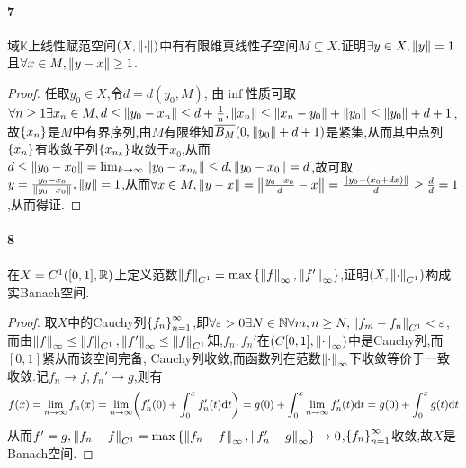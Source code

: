 \documentclass{article}
\begin{document}
\paragraph{7}域$\mathbb{K}$上线性赋范空间$(X,\left\|\cdot\right\|)$中有有限维真线性子空间$M\subsetneq X$.证明$\exists y\in X, \left\|y\right\|=1$且$\forall x\in M, \left\|y-x\right\|\geq 1$.
\begin{proof}
    任取$y_0\in X$,令$d=d(y_0,M)$, 由$\inf$性质可取$\forall n\geq 1\exists x_n\in M,d\leq \left\|y_0-x_n\right\|\leq d+\frac{1}{n}, \left\|x_n\right\|\leq \left\|x_n-y_0\right\|+\left\|y_0\right\|\leq \left\|y_0\right\|+d+1$,故$\left\{x_n\right\}$是$M$中有界序列,由$M$有限维知$\overline{B_M}(0,\left\|y_0\right\|+d+1)$是紧集,从而其中点列$\left\{x_n\right\}$有收敛子列$\left\{x_{n_k}\right\}$收敛于$x_0$,从而$d\leq \left\|y_0-x_0\right\|=\lim_{k\to\infty}\left\|y_0-x_{n_k}\right\|\leq d,\left\|y_0-x_0\right\|=d$,故可取$y=\frac{y_0-x_0}{\left\|y_0-x_0\right\|},\left\|y\right\|=1$,从而$\forall x\in M, \left\|y-x\right\|=\left\|\frac{y_0-x_0}{d}-x\right\|=\frac{\left\|y_0-(x_0+dx)\right\|}{d}\geq \frac{d}{d}=1$,从而得证.
\end{proof}

\paragraph{8}在$X=C^1([0,1],\mathbb{R})$上定义范数$\left\|f\right\|_{C^1}=\max\left\{\left\|f\right\|_\infty,\left\|f'\right\|_\infty\right\}$,证明$(X,\left\|\cdot\right\|_{C^1})$构成实Banach空间.
\begin{proof}
    取$X$中的Cauchy列$\left\{f_n\right\}_{n=1}^\infty$,即$\forall \varepsilon>0\exists N\in\mathbb{N}\forall m,n\geq N, \left\|f_m-f_n\right\|_{C^1}< \varepsilon$,而由$\left\|f\right\|_\infty\leq \left\|f\right\|_{C^1}, \left\|f'\right\|_\infty\leq \left\|f\right\|_{C^1}$知,$f_n,f_n'$在$(C[0,1],\left\|\cdot\right\|_\infty)$中是Cauchy列,而$[0,1]$紧从而该空间完备, Cauchy列收敛,而函数列在范数$\left\|\cdot\right\|_\infty$下收敛等价于一致收敛.记$f_n\to f, f_n'\to g$,则有
    $$f(x)=\lim_{n\to\infty}f_n(x)=\lim_{n\to\infty}\!\left(f_n'(0)+\int_0^x f_n'(t)\mathrm{d} t\right)=g(0)+\int_0^x \lim_{n\to\infty} f_n'(t) \mathrm{d} t=g(0)+\int_0^x g(t)\mathrm{d} t$$
    从而$f'=g,\left\|f_n-f\right\|_{C^1}=\max\left\{\left\|f_n-f\right\|_\infty,\left\|f_n'-g\right\|_\infty\right\}\to 0$,$\left\{f_n\right\}_{n=1}^\infty$收敛,故$X$是Banach空间.
\end{proof}
\end{document}
